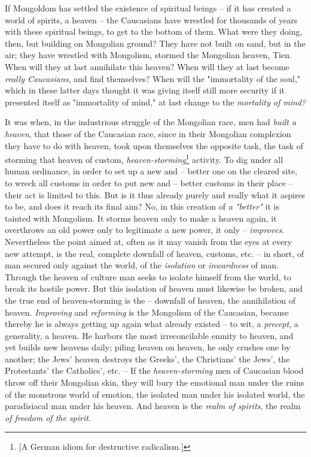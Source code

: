\documentclass[a4paper]{book}
\begin{document}
If Mongoldom has settled the existence of spiritual beings -- if it has 
created a world of spirits, a heaven -- the Caucasians have wrestled for 
thousands of years with these spiritual beings, to get to the bottom of them. 
What were they doing, then, but building on Mongolian ground? They have not 
built on sand, but in the air; they have wrestled with Mongolism, stormed the 
Mongolian heaven, Tien. When will they at last annihilate this heaven? When 
will they at last become \textit{really Caucasians}, and find themselves? When 
will the "{}immortality of the soul,"{} which in these latter days thought it 
was giving itself still more security if it presented itself as "{}immortality 
of mind,"{} at last change to the \textit{mortality of mind?}

It was when, in the industrious struggle of the Mongolian race, men had 
\textit{built a heaven}, that those of the Caucasian race, since in their 
Mongolian complexion they have to do with heaven, took upon themselves the 
opposite task, the task of storming that heaven of custom, 
\textit{heaven-storming}\footnote{[A German idiom for destructive 
radicalism.]} activity. To dig under all human ordinance, in order to set up a 
new and -- better one on the cleared site, to wreck all customs in order to 
put new and -- better customs in their place -- their act is limited to this. 
But is it thus already purely and really what it aspires to be, and does it 
reach its final aim? No, in this creation of \textit{a "{}better"{}} it is 
tainted with Mongolism. It storms heaven only to make a heaven again, it 
overthrows an old power only to legitimate a new power, it only -- 
\textit{improves}. Nevertheless the point aimed at, often as it may vanish 
from the eyes at every new attempt, is the real, complete downfall of heaven, 
customs, etc. -- in short, of man secured only against the world, of the 
\textit{isolation} or \textit{inwardness} of man. Through the heaven of 
culture man seeks to isolate himself from the world, to break its hostile 
power. But this isolation of heaven must likewise be broken, and the true end 
of heaven-storming is the -- downfall of heaven, the annihilation of heaven. 
\textit{Improving} and \textit{reforming} is the Mongolism of the Caucasian, 
because thereby he is always getting up again what already existed -- to wit, 
a \textit{precept}, a generality, a heaven. He harbors the most irreconcilable 
enmity to heaven, and yet builds new heavens daily; piling heaven on heaven, 
he only crushes one by another; the Jews' heaven destroys the Greeks', the 
Christians' the Jews', the Protestants' the Catholics', etc. -- If the 
\textit{heaven-storming} men of Caucasian blood throw off their Mongolian 
skin, they will bury the emotional man under the ruins of the monstrous world 
of emotion, the isolated man under his isolated world, the paradisiacal man 
under his heaven. And heaven is the \textit{realm of spirits}, the realm 
\textit{of freedom of the spirit}.
\end{document}

